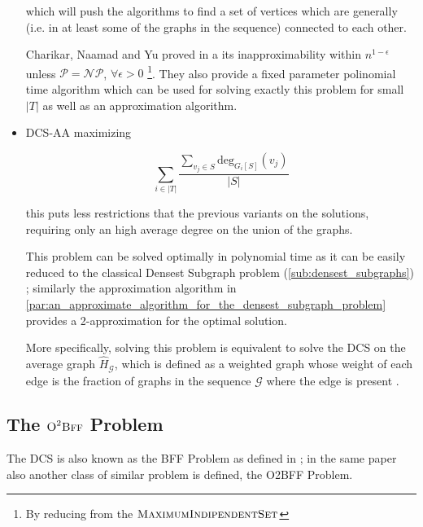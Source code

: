 \begin{itemize}
	      which will push the algorithms to find a set of vertices which are
	      generally (i.e. in at least some of the graphs in the sequence)
	      connected to each other.

	      Charikar, Naamad and Yu proved in \cite{charikar2018finding} a
	      its inapproximability within $n^{1-\epsilon} $ unless
	      $\mathcal{P} = \mathcal{NP}  $, $\forall \epsilon > 0$
	      \footnote{By reducing from the
		      $\textsc{MaximumIndipendentSet}$}. They also provide a fixed
	      parameter polinomial time algorithm which can be used for solving
	      exactly this problem for small $|T|$ as well as an approximation
	      algorithm.
	\item \acrshort{DCS}-AA maximizing

	      \begin{equation}
		      \label{eq:dcs-aa}
		      \sum^{}_{i \in |T|} \frac{\sum^{}_{v_{j} \in S} \text{deg}_{G_i[S]}
		      (v_{j} )}{|S|}
	      \end{equation}

	      this puts less restrictions that the previous variants on the
	      solutions, requiring only an high average degree on the union of the
	      graphs.

	      This problem can be solved optimally in polynomial time as it can be
	      easily reduced to the classical Densest Subgraph problem
	      (\autoref{sub:densest_subgraphs}) \cite{semertzidis2019finding};
	      similarly the approximation algorithm in
	      \autoref{par:an_approximate_algorithm_for_the_densest_subgraph_problem}
	      provides a 2-approximation for the optimal solution.

	      More specifically, solving this problem is equivalent to solve the
	      \acrfull{DCS} on the average graph $\hat{H}_{\mathcal{G} }  $, which
	      is defined as a weighted graph whose weight of each edge is the
	      fraction of graphs in the sequence $\mathcal{G} $ where the edge is
	      present \cite{semertzidis2019finding}.
\end{itemize}

\subsection{The $\textsc{O}^{2} \textsc{Bff}$ Problem}%
\label{sub:the_o_2_bff_problem}

The \acrshort{DCS} is also known as the \acrfull{BFF} Problem as defined in
\cite{semertzidis2019finding}; in the same paper also another class of similar
problem is defined, the \acrlong{O2BFF} Problem.

